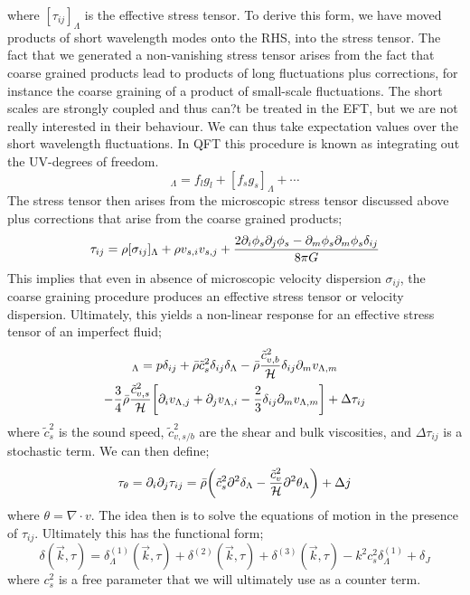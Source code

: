 where $[\tau_{ij}]_\Lambda$ is the effective stress tensor. To derive this form, we have moved products of short wavelength modes onto the RHS, into the stress tensor. The fact that we generated a non-vanishing stress tensor arises from the fact that coarse grained products lead to products of long fluctuations plus corrections, for instance the coarse graining of a product of small-scale fluctuations. The short scales are strongly coupled and thus can?t be treated in the EFT, but we are not really interested in their behaviour. We can thus take expectation values over the short wavelength fluctuations. In QFT this procedure is known as integrating out the UV-degrees of freedom.
\begin{equation*}
[fg]_{\Lambda} = f_l g_l + [f_s g_s]_\Lambda + \cdots
\end{equation*}
The stress tensor then arises from the microscopic stress tensor discussed above plus corrections that arise from the coarse grained products;
\begin{equation}
\tau_{ij} = \rho[\sigma_{ij}]_{\Lambda} + \rho v_{s, i}v_{s, j} + \frac{2\partial_i \phi_s \partial_j \phi_s - \partial_m \phi_s \partial_m \phi_s \delta_{ij}}{8\pi G}
\end{equation}
This implies that even in absence of microscopic velocity dispersion $\sigma_{ij}$, the coarse graining procedure produces an effective stress tensor or velocity dispersion. Ultimately, this yields a non-linear response for an effective stress tensor of an imperfect fluid;
\begin{multline}
[\tau_{ij}]_\Lambda = p\delta_{ij} + \bar{\rho} \tilde{c}_s^2 \delta_{ij} \delta_{\Lambda} - \bar{\rho}\frac{\tilde{c}_{v,b}^2}{\hamilt}\delta_{ij}\del_m v_{\Lambda, m} \\ - \frac{3}{4}\bar{\rho}\frac{\tilde{c}^2_{v,s}}{\hamilt}\left[\del_i v_{\Lambda, j} + \del_j v_{\Lambda, i} - \frac{2}{3}\delta_{ij}\del_m v_{\Lambda, m}\right] + \Delta \tau_{ij}
\end{multline}
where $\tilde{c}_s^2$ is the sound speed, $\tilde{c}_{v,s/b}^2$ are the shear and bulk viscosities, and $\Delta \tau_{ij}$ is a stochastic term. We can then define;
\begin{equation*}
\tau_\theta = \del_i \del_j \tau_{ij} = \bar{\rho}\left(\tilde{c}_s^2 \del^2 \delta_{\Lambda} - \frac{\tilde{c}^2_v}{\hamilt}\del^2 \theta_{\Lambda}\right) + \Delta j
\end{equation*}
where $\theta = \nabla \cdot v$. The idea then is to solve the equations of motion in the presence of $\tau_{ij}$. Ultimately this has the functional form;
\begin{equation*}
\delta(\vec{k}, \tau) = \delta_\Lambda^{(1)}(\vec{k}, \tau) + \delta^{(2)}(\vec{k}, \tau) + \delta^{(3)}(\vec{k}, \tau) - k^2 c_s^2 \delta_{\Lambda}^{(1)} + \delta_J
\end{equation*}
where $c_s^2$ is a free parameter that we will ultimately use as a counter term.
